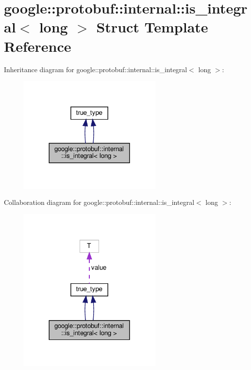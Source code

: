 \hypertarget{structgoogle_1_1protobuf_1_1internal_1_1is__integral_3_01long_01_4}{}\section{google\+:\+:protobuf\+:\+:internal\+:\+:is\+\_\+integral$<$ long $>$ Struct Template Reference}
\label{structgoogle_1_1protobuf_1_1internal_1_1is__integral_3_01long_01_4}


Inheritance diagram for google\+:\+:protobuf\+:\+:internal\+:\+:is\+\_\+integral$<$ long $>$\+:
\nopagebreak
\begin{figure}[H]
\begin{center}
\leavevmode
\includegraphics[width=204pt]{structgoogle_1_1protobuf_1_1internal_1_1is__integral_3_01long_01_4__inherit__graph}
\end{center}
\end{figure}


Collaboration diagram for google\+:\+:protobuf\+:\+:internal\+:\+:is\+\_\+integral$<$ long $>$\+:
\nopagebreak
\begin{figure}[H]
\begin{center}
\leavevmode
\includegraphics[width=204pt]{structgoogle_1_1protobuf_1_1internal_1_1is__integral_3_01long_01_4__coll__graph}
\end{center}
\end{figure}
